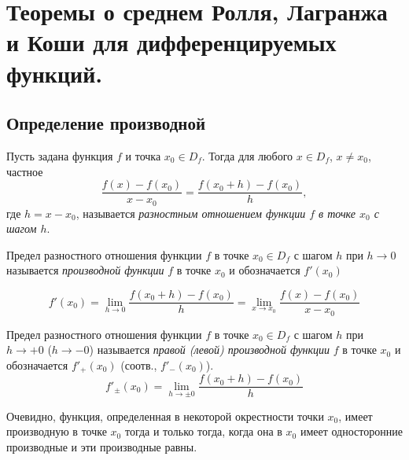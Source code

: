 \chapter{Теоремы о среднем Ролля, Лагранжа и Коши для дифференцируемых функций.}

\section{Определение производной}

Пусть задана функция $f$ и точка $x_0\in D_f$. Тогда для любого $x \in D_f$, $x\ne x_0$, частное
\begin{equation}\label{ya3e1}
\frac{f(x)-f(x_0)}{x-x_0}=\frac{f(x_0+h)-f(x_0)}{h}, 
\end{equation}
где $h=x-x_0$, называется \textit{разностным отношением функции $f$ в точке $x_0$ с шагом $h$}.

\begin{defn}
\label{ya3d1}
Предел разностного отношения функции $f$ в точке $x_0 \in D_f$ с шагом $h$ при $h \to 0$ называется \textit{производной функции} $f$ в точке $x_0$ и обозначается $f'(x_0)$

\begin{equation}\label{ya3e2}
f'(x_0)=\lim_{h\to 0}\limits\frac{f(x_0+h)-f(x_0)}{h}=\lim_{x\to x_0}\limits \frac{f(x)-f(x_0)}{x-x_0}
\end{equation}

\end{defn}
\begin{defn} Предел разностного отношения функции $f$ в точке $x_0 \in D_f$ с шагом $h$ при $h \to +0 $ ($h \to -0$) называется \textit{правой (левой) производной функции} $f$ в точке $x_0$ и обозначается $f'_+(x_0)$ (соотв., $f'_-(x_0)$).
\begin{equation}\label{ya3e3}
f'_\pm(x_0)=\lim_{h\to \pm0}\limits\frac{f(x_0+h)-f(x_0)}{h}
\end{equation}
\end{defn}

Очевидно, функция, определенная в некоторой окрестности точки $x_0$, имеет производную в точке $x_0$ тогда и только тогда, когда она в $x_0$ имеет односторонние производные и эти производные равны.

